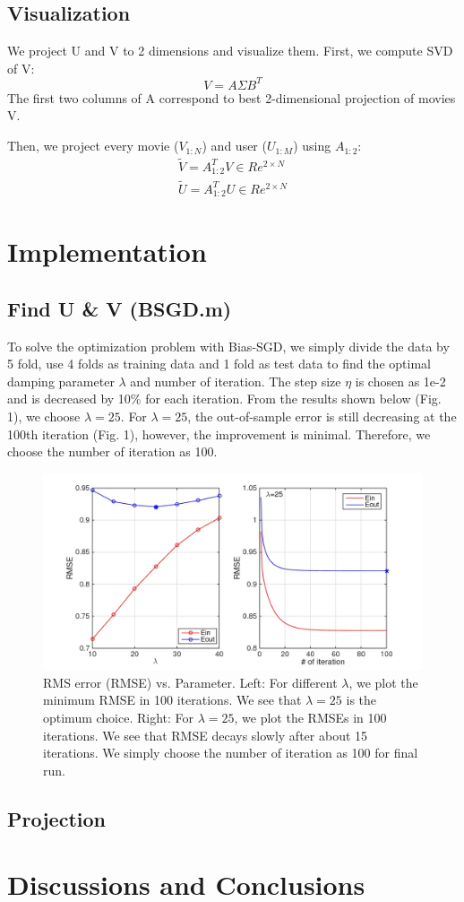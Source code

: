 \documentclass[12pt]{article}
\begin{document}
\subsection{Visualization}
We project U and V to 2 dimensions and visualize them. First, we compute SVD of V:
\begin{equation*}
V=A\Sigma B^{T}
\end{equation*}
The first two columns of A correspond to best 2-dimensional projection of movies V.

Then, we project every movie ($V_{1:N}$) and user ($U_{1:M}$) using $A_{1:2}$:
\begin{eqnarray*}
\tilde{V}=A_{1:2}^{T} V \in Re^{2\times N}\\
\tilde{U}=A_{1:2}^{T} U \in Re^{2\times N}
\end{eqnarray*}

\section{Implementation}
\subsection{Find U \& V (BSGD.m)}
To solve the optimization problem with Bias-SGD, we simply divide the data by 5 fold, use 4 folds as training data and 1 fold as test data to find the optimal damping parameter $\lambda$  and number of iteration. The step size $\eta$ is chosen as 1e-2 and is decreased by 10\% for each iteration. From the results shown below (Fig. 1), we choose $\lambda=25$. For $\lambda=25$, the out-of-sample error is still decreasing at the 100th iteration (Fig. 1), however, the improvement is minimal. Therefore, we choose the number of iteration as 100.

\begin{figure}[h!]
  \centering
      \includegraphics[width=1.0\textwidth]{testparameter}
  \caption{RMS error (RMSE) vs. Parameter. Left: For different $\lambda$, we plot the minimum RMSE in 100 iterations. We see that $\lambda=25$ is the optimum choice. Right: For $\lambda=25$, we plot the RMSEs in 100 iterations. We see that RMSE decays slowly after about 15 iterations. We simply choose the number of iteration as 100 for final run.}
\end{figure}


\subsection{Projection}

\section{Discussions and Conclusions}
\end{document}
